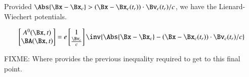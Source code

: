 Provided $\Abs{\Bx - \Bx_c} > (\Bx - \Bx_c(t_r)) \cdot \Bv_c(t_r)/c$, we have the Lienard-Wiechert potentials.

\begin{equation}\label{eqn:relativisticElectrodynamicsL18:720}
\begin{bmatrix}
A^0(\Bx, t) \\
\BA(\Bx, t)
\end{bmatrix}
=
e 
\begin{bmatrix}
1 \\
\frac{\Bv_c}{c}
\end{bmatrix}
\inv{
\Abs{\Bx - \Bx_c} - (\Bx - \Bx_c(t_r)) \cdot \Bv_c(t_r)/c }
\end{equation}

FIXME: Where provides the previous inequality required to get to this final point.

\EndArticle
